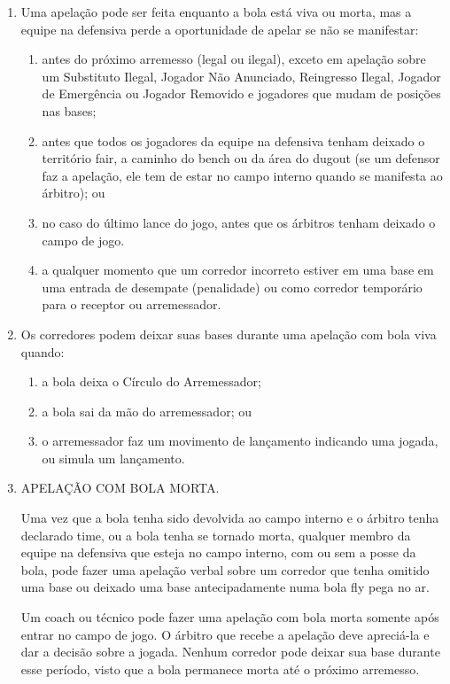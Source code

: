 \begin{enumerate}[label=(\alph*)]
	\item Uma apelação pode ser feita enquanto a bola está viva ou morta, mas a equipe na defensiva perde a oportunidade de apelar se não se manifestar:
	 \begin{enumerate}[label=\roman*.]
		\item antes do próximo arremesso (legal ou ilegal), exceto em apelação sobre um Substituto Ilegal, Jogador Não Anunciado, Reingresso Ilegal, Jogador de Emergência ou Jogador Removido e jogadores que mudam de posições nas bases;
		\item  antes que todos os jogadores da equipe na defensiva tenham deixado o território \gls{fair}, a caminho do \gls{bench} ou da área do \gls{dugout} (se um defensor faz a apelação, ele tem de estar no campo interno quando se manifesta ao árbitro); ou
		\item no caso do último lance do jogo, antes que os árbitros tenham deixado o campo de jogo.
		\item a qualquer momento que um corredor incorreto estiver em uma base em uma  entrada de desempate (penalidade) ou como corredor temporário para o receptor ou arremessador.
	\end{enumerate}
\item Os corredores podem deixar suas bases durante uma apelação com bola viva  quando:
	\begin{enumerate}[label=\roman*.]
		\item a bola deixa o Círculo do Arremessador;
		\item a bola sai da mão do arremessador; ou
		\item o arremessador faz um movimento de lançamento indicando uma jogada, ou simula um lançamento.
	\end{enumerate}
\item  APELAÇÃO COM BOLA MORTA.

	  Uma vez que a bola tenha sido devolvida  ao campo interno e o árbitro tenha declarado \gls{time}, ou a bola tenha se tornado morta, qualquer membro da equipe na defensiva que esteja no campo interno, com ou sem a posse da bola, pode fazer uma apelação verbal sobre um corredor que tenha omitido uma base ou deixado uma base antecipadamente numa bola  \gls{fly} pega no ar.

	  Um \gls{coach} ou técnico pode fazer uma apelação com bola morta  somente após entrar no campo de jogo. O árbitro que recebe a apelação deve apreciá-la e dar a decisão sobre a jogada. Nenhum corredor pode deixar sua base durante esse período, visto que a bola permanece morta até o próximo arremesso.


\end{enumerate}

